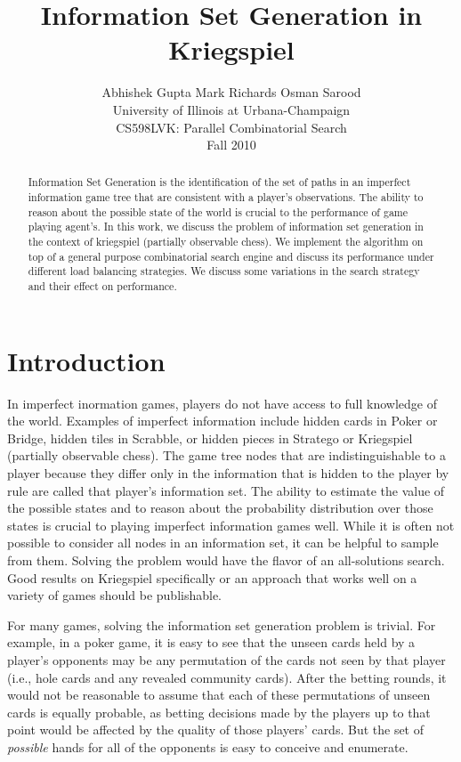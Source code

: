 \documentclass[11pt]{article}
\begin{document}
\title{Information Set Generation in Kriegspiel}
\author{Abhishek Gupta	Mark Richards	Osman Sarood\\University of Illinois at Urbana-Champaign\\CS598LVK: Parallel Combinatorial Search\\Fall 2010}
\maketitle

\begin{abstract}
Information Set Generation is the identification of the set of paths in an imperfect information game tree that are consistent with a player's observations.  The ability to reason about the possible state of the world is crucial to the performance of game playing agent's.  In this work, we discuss the problem of information set generation in the context of kriegspiel (partially observable chess).  We implement the algorithm on top of a general purpose combinatorial search engine and discuss its performance under different load balancing strategies.  We discuss some variations in the search strategy and their effect on performance.
\end{abstract}

\section{Introduction}
In imperfect inormation games, players do not have access to full knowledge of the world. Examples of imperfect information include hidden cards in Poker or Bridge, hidden tiles in Scrabble, or hidden pieces in Stratego or Kriegspiel (partially observable chess). The game tree nodes that are indistinguishable to a player because they differ only in the information that is hidden to the player by rule are called that player's information set. The ability to estimate the value of the possible states and to reason about the probability distribution over those states is crucial to playing imperfect information games well. While it is often not possible to consider all nodes in an information set, it can be helpful to sample from them. Solving the problem would have the flavor of an all-solutions search. Good results on Kriegspiel specifically or an approach that works well on a variety of games should be publishable.

For many games, solving the information set generation problem is trivial.  For example, in a poker game, it is easy to see that the unseen cards held by a player's opponents may be any permutation of the cards not seen by that player (i.e., hole cards and any revealed community cards).  After the betting rounds, it would not be reasonable to assume that each of these permutations of unseen cards is equally probable, as betting decisions made by the players up to that point would be affected by the quality of those players' cards.  But the set of {\em possible} hands for all of the opponents is easy to conceive and enumerate.
\end{document}
